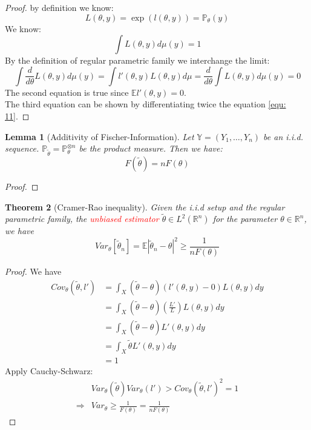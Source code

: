 \documentclass[a4paper,12pt, oneside, fleqn]{book}
\newtheorem{theorem}{Theorem}[section]
\newtheorem{lemma}[theorem]{Lemma}
\theoremstyle{definition}
\theoremstyle{remark}
\begin{document}
\begin{proof}
	by definition we know:
	\begin{equation} \label{equ: 11}
		L(\theta, y) = \exp (l(\theta, y)) = \mathbb{P}_\theta(y)
	\end{equation}
	We know:
	\begin{equation*}
		\int L(\theta, y) d\mu(y) = 1
	\end{equation*}
	By the definition of regular parametric family we interchange the limit:
	\begin{equation*}
		\int \frac{d}{d\theta} L(\theta, y) d\mu(y) = \int l'(\theta, y) L(\theta, y)d\mu = \frac{d}{d\theta} \int L(\theta, y) d\mu(y) = 0
	\end{equation*}
	The second equation is true since $\mathbb{E}l'(\theta, y) = 0$.\\
	The third equation can be shown by differentiating twice the equation \ref{equ: 11}.
\end{proof}

\begin{lemma}[Additivity of Fischer-Information]
Let $\mathbb{Y} = (Y_1, \dots, Y_n)$ be an i.i.d. sequence. $\mathbb{P}_{\tilde{\theta}} = \mathbb{P}_\theta^{\otimes n}$ be the product measure.	 Then we have:
\begin{equation}
	F(\tilde{\theta}) = nF(\theta)
\end{equation}
\end{lemma}

\begin{proof}
	
\end{proof}

\begin{theorem}[Cramer-Rao inequality]
	Given the i.i.d setup and the regular parametric family, the \textcolor{red} {unbiased estimator} $\tilde{\theta}\in L^2(\mathbb{R}^n) $ for the parameter $\theta \in \mathbb{R}^n $, we have
	\begin{equation*}
		Var_\theta[\tilde{\theta}_n] =  \mathbb{E} |\tilde{\theta}_n - \theta|^2 \geq \frac{1}{n F(\theta)}
	\end{equation*}
\end{theorem}
\begin{proof}
We have
\begin{align*}
	Cov_\theta(\tilde{\theta}, l') &= \int_X (\tilde{\theta} - \theta)(l'(\theta, y) - 0)L(\theta, y) dy \\
	&= \int_X (\tilde{\theta} - \theta)(\frac{L'}{L})L(\theta, y)dy\\
	&= \int_X (\tilde{\theta} - \theta) L'(\theta, y) dy\\
	&= \int_X \tilde{\theta} L'(\theta, y) dy\\
	&= 1
\end{align*}
Apply Cauchy-Schwarz:
\begin{align*}
	&Var_\theta (\tilde{\theta}) Var_\theta(l') > Cov_\theta(\tilde{\theta}, l')^2 = 1\\
	\Rightarrow &Var_\theta \geq \frac{1}{F(\theta)} = \frac{1}{nF(\theta)}
\end{align*}
\end{proof}
\end{document}
